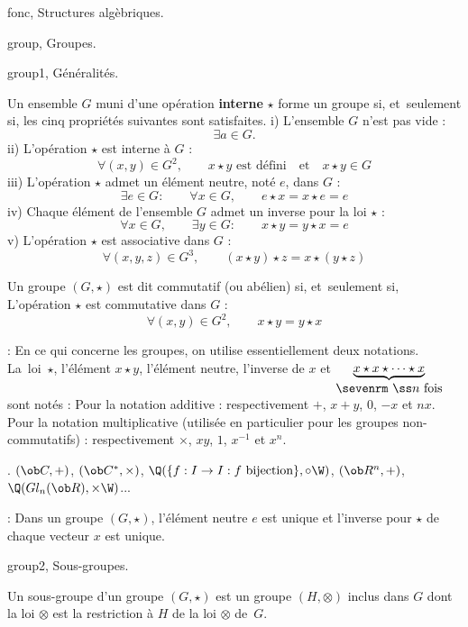 

\Chapter fonc, Structures algèbriques. 
\bigskip

\Section group, Groupes. 

\Subsection group1, Généralités. 


\Definition Un ensemble $G$ muni d'une opération {\bf interne} $\star$ forme un groupe si, et~seulement si, 
les cinq propriétés suivantes sont satisfaites.
\pn
i) L'ensemble $G$ n'est pas vide : 
$$
\exists a\in G.
$$ 
\noindent ii) L'opération $\star$ est interne à $G$ : 
$$
\forall (x,y)\in G^2, \qquad x\star y\mbox{ est défini}\quad\mbox{et}\quad x\star y\in G
$$
\noindent iii) L'opération $\star$ admet un élément neutre, noté $e$, dans $G$ : 
$$
\exists e\in G:\qquad \forall x\in G,\qquad e\star x=x\star e=e
$$
\noindent iv) Chaque élément de l'ensemble $G$ admet un inverse pour la loi $\star$ : 
$$
\forall x\in G, \qquad \exists y\in G:\qquad x\star y=y\star x=e
$$
\noindent v) L'opération $\star$ est associative dans $G$ :
$$
\forall (x,y,z)\in G^3, \qquad(x\star y)\star z=x\star(y\star z)
$$

\bigskip

\Definition Un groupe $(G,\star)$ est dit commutatif (ou abélien) si, et~seulement si, 
L'opération $\star$ est commutative dans $G$ : 
$$
\forall (x,y)\in G^2, \qquad x\star y=y\star x
$$
\bigskip

\Remarque : En ce qui concerne les groupes, on utilise essentiellement deux notations. 
La~loi~$\star$, l'élément $x\star y$, l'élément neutre, l'inverse de $x$ et $\underbrace{x\star x\star \cdots\star x}_{\mbox{\sevenrm $\ss n$ fois}}$ sont notés : 
\medskip
\noindent
Pour la notation additive : respectivement $+$, $x+y$, $0$, $-x$ et $nx$.
\medskip
\noindent
Pour la notation multiplicative (utilisée en particulier pour les groupes non-commutatifs) : respectivement $\times$, $xy$, $1$, $x^{-1}$ et $x^n$.
\bigskip

\Exemples.  $(\ob C,+)$, $(\ob C^*, \times)$, $\Q(\{f:I\to I: f\mbox{ bijection}\}, \circ\W)$, $(\ob R^n,+)$, $\Q(Gl_n(\ob R), \times\W)$... 
\bigskip


\Remarque : Dans un groupe $(G,\star)$, l'élément neutre $e$ est unique et l'inverse pour $\star$ de chaque vecteur $x$ est unique. 
\bigskip

\Subsection group2, Sous-groupes.

\Definition [] Un sous-groupe d'un groupe $(G,\star)$ est un groupe $(H, \otimes)$ inclus dans $G$ dont la loi
$\otimes$ est la restriction à $H$ de la loi $\otimes$ de~$G$.  \bigskip

